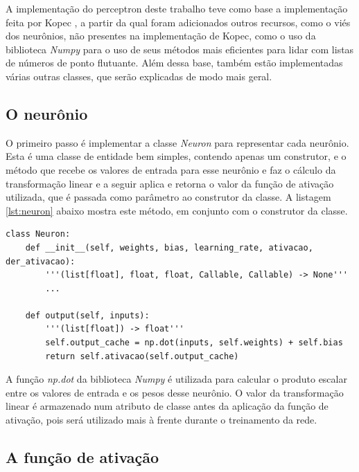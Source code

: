 A implementação do perceptron deste trabalho teve como base a implementação feita por Kopec \citep{classic}, a partir da qual foram adicionados outros recursos, como o viés dos neurônios, não presentes na implementação de Kopec, como o uso da biblioteca \emph{Numpy} para o uso de seus métodos mais eficientes para lidar com listas de números de ponto flutuante. Além dessa base, também estão implementadas várias outras classes, que serão explicadas de modo mais geral.

\subsection{O neurônio}

O primeiro passo é implementar a classe \emph{Neuron} para representar cada neurônio. Esta é uma classe de entidade bem simples, contendo apenas um construtor, e o método  que recebe os valores de entrada para esse neurônio e faz o cálculo da transformação linear e a seguir aplica e retorna o valor da função de ativação utilizada, que é passada como parâmetro ao construtor da classe. A listagem \ref{lst:neuron} abaixo mostra este método, em conjunto com o construtor da classe.

\begin{scriptsize}
\estiloR
\begin{lstlisting}[caption={Trecho da classe Neuron}, label={lst:neuron}, escapeinside={\%}]
class Neuron:
    def __init__(self, weights, bias, learning_rate, ativacao, der_ativacao):
        '''(list[float], float, float, Callable, Callable) -> None'''
        ...

    def output(self, inputs):
        '''(list[float]) -> float'''
        self.output_cache = np.dot(inputs, self.weights) + self.bias
        return self.ativacao(self.output_cache)
\end{lstlisting}
\end{scriptsize}

A função \emph{np.dot} da biblioteca \emph{Numpy} é utilizada para calcular o produto escalar entre os valores de entrada e os pesos desse neurônio. O valor da transformação linear é armazenado num atributo de classe antes da aplicação da função de ativação, pois será utilizado mais à frente durante o treinamento da rede.

\subsection{A função de ativação}

